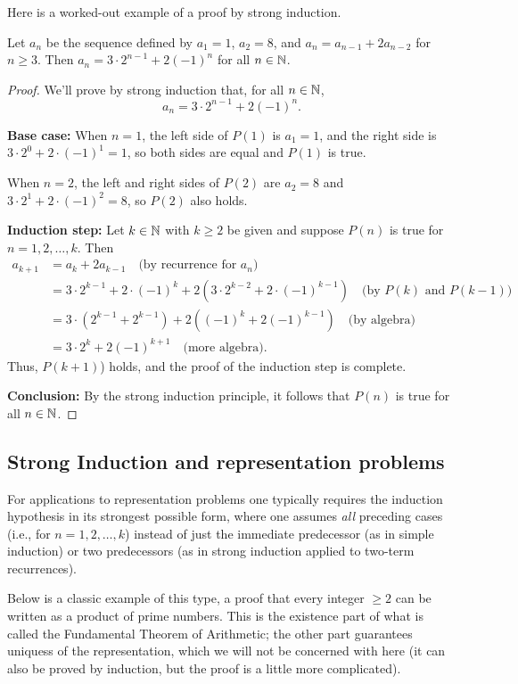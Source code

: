 Here is a worked-out example of a proof by strong induction.


\begin{prop}
Let $a_n$ be the sequence defined by 
$a_1=1$, $a_2=8$, and $a_n=a_{n-1}+2a_{n-2}$ for $n\ge3$.
Then
$a_n=3\cdot 2^{n-1}+2(-1)^n$ for all $n\in\mathbb{N}$.
\end{prop}

\begin{proof}
We'll prove by strong induction that, for all $n\in\mathbb{N}$, 
\[
\tag{$P(n)$}
a_n=3\cdot 2^{n-1}+2(-1)^n.
\]

\textbf{Base case:} 
When $n=1$, the left side of $P(1)$ is $a_1 =1$, and
the right side is $3\cdot 2^{0}+2\cdot(-1)^1=1$,
so both sides are equal and $P(1)$ is
true. 

When $n=2$, the left and right sides of $P(2)$ are
$a_2=8$ and $3\cdot 2^1+2\cdot(-1)^2=8$, so $P(2)$ also holds.


\textbf{Induction step:} Let $k\in\mathbb{N}$ with $k\ge2$ be given and suppose 
$P(n)$ is true for $n=1,2,\dots,k$. Then
\begin{align*}
a_{k+1}&=a_{k}+2a_{k-1}
\quad \text{(by recurrence for $a_n$)}
\\
&=
3\cdot 2^{k-1}+2\cdot(-1)^k
+2\left(3\cdot 2^{k-2}+2\cdot(-1)^{k-1}\right)
\quad \text{(by $P(k)$ and $P(k-1)$)}
\\
&=
3\cdot \left(2^{k-1}+2^{k-1}\right) 
+2\left((-1)^k+2(-1)^{k-1}\right)
\quad \text{(by algebra)}
\\
&=
3\cdot 2^k+2(-1)^{k+1}
\quad \text{(more algebra).}
\end{align*}
Thus, $P(k+1)$) holds, and the proof of the induction step is complete. 

\textbf{Conclusion:} By the strong induction principle,  it follows that
$P(n)$ is true for all $n\in\mathbb{N}$.  
\end{proof}

\subsection*{Strong Induction and representation problems}
For applications to representation problems one 
typically requires the induction hypothesis in its strongest possible
form, where one assumes \emph{all} preceding
cases (i.e., for $n=1,2,\dots,k$) instead of just the immediate
predecessor (as in simple induction) or two predecessors (as in strong induction applied to two-term recurrences). 

Below is a classic example of this type, a proof that every integer
$\ge2$ can be written as a product of prime numbers. This is the
existence part of what is called the Fundamental Theorem of Arithmetic;
the other part guarantees uniquess of the representation, which we will
not be concerned with here (it can also be proved by induction, but the proof is a little more complicated).  

